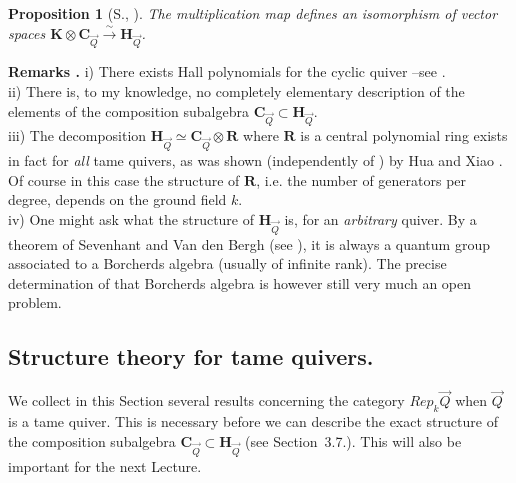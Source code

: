 \documentclass[a4paper,10pt]{amsart}
\def\H{\mathbf{H}}
\newtheorem{prop}[theo]{Proposition}
\numberwithin{equation}{section}
\begin{document}
\vspace{.1in}

\begin{prop}[S., \cite{SDuke}]\label{P:halldecomp} The multiplication map defines an isomorphism of vector spaces $\mathbf{K} \otimes \mathbf{C}_{\vec{Q}} \stackrel{\sim}{\to} \H_{\vec{Q}}$.\end{prop}

\vspace{.15in}

\addtocounter{theo}{1}
\noindent \textbf{Remarks \thetheo .} i) There exists Hall polynomials for the cyclic quiver --see \cite{Ringelcomposcyclic}.\\
ii) There is, to my knowledge, no completely elementary description of the elements of the composition subalgebra $\mathbf{C}_{\vec{Q}} \subset \H_{\vec{Q}}$.\\
iii) The decomposition $\H_{\vec{Q}} \simeq \mathbf{C}_{\vec{Q}} \otimes \mathbf{R}$ where $\mathbf{R}$ is a central polynomial ring exists in fact for \textit{all} tame quivers, as was shown (independently of \cite{S1}) by Hua and Xiao
\cite{HuaXiao}. Of course in this case the structure of $\mathbf{R}$, i.e. the number of generators per degree, depends on the ground field $k$.\\
iv) One might ask what the structure of $\H_{\vec{Q}}$ is, for an \textit{arbitrary} quiver. By a theorem of Sevenhant and Van den Bergh (see \cite{SVdB}), it is always a quantum group associated to a Borcherds algebra (usually of infinite rank). The precise determination of that Borcherds algebra is however still very much an open problem.

\vspace{.2in}

\subsection{Structure theory for tame quivers.}


\vspace{.15in}

We collect in this Section several results concerning the category $Rep_k\vec{Q}$ when $\vec{Q}$ is a tame quiver. This is necessary before we can describe the exact structure of the composition subalgebra $\mathbf{C}_{\vec{Q}} \subset \H_{\vec{Q}}$ (see Section~3.7.). This will also be important for the next Lecture.
\end{document}
